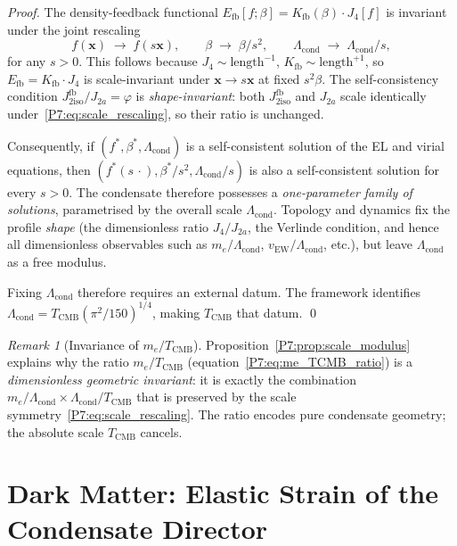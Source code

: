 \documentclass[11pt,a4paper]{article}
\theoremstyle{definition}
\theoremstyle{remark}
\newtheorem{remark}[theorem]{Remark}
\newcommand{\vp}{\varphi}
\newcommand{\bst}{\beta^{*}}
\providecommand{\Kfb}{K_{\mathrm{fb}}}
\providecommand{\Efb}{E_{\mathrm{fb}}}
\newcommand{\TCMB}{T_{\mathrm{CMB}}}
\newcommand{\Lcond}{\Lambda_{\mathrm{cond}}}
\newcommand{\Ja}{J_{2a}}
\newcommand{\Jfb}{J_{2\mathrm{iso}}^{\mathrm{fb}}}
\newcommand{\Jfour}{J_{4}}
\begin{document}
\begin{proof}
The density-feedback functional $\Efb[f;\beta] = \Kfb(\beta)\cdot\Jfour[f]$
is invariant under the joint rescaling
\begin{equation}
  f(\mathbf{x}) \;\to\; f(s\mathbf{x}),
  \qquad
  \beta \;\to\; \beta/s^2,
  \qquad
  \Lcond \;\to\; \Lcond/s,
  \label{P7:eq:scale_rescaling}
\end{equation}
for any $s>0$.
This follows because $\Jfour\sim\mathrm{length}^{-1}$, $\Kfb\sim\mathrm{length}^{+1}$,
so $\Efb = \Kfb\cdot\Jfour$ is scale-invariant under $\mathbf{x}\to s\mathbf{x}$
at fixed $s^2\beta$.
The self-consistency condition $\Jfb/\Ja = \vp$ is \emph{shape-invariant}:
both $\Jfb$ and $\Ja$ scale identically under~\eqref{P7:eq:scale_rescaling},
so their ratio is unchanged.

Consequently, if $(f^*, \bst, \Lcond)$ is a self-consistent solution of
the EL and virial equations, then $(f^*(s\,\cdot), \bst/s^2, \Lcond/s)$
is also a self-consistent solution for every $s>0$.
The condensate therefore possesses a \emph{one-parameter family of solutions},
parametrised by the overall scale $\Lcond$.
Topology and dynamics fix the profile \emph{shape} (the dimensionless ratio
$J_4/J_{2a}$, the Verlinde condition, and hence all dimensionless
observables such as $m_e/\Lcond$, $v_\mathrm{EW}/\Lcond$, etc.),
but leave $\Lcond$ as a free modulus.

Fixing $\Lcond$ therefore requires an external datum.
The framework identifies $\Lcond = \TCMB(\pi^2/150)^{1/4}$, making
$\TCMB$ that datum.
\qed
\end{proof}

\begin{remark}[Invariance of $m_e/\TCMB$]
\label{P7:rem:me_tcmb_invariance}
Proposition~\ref{P7:prop:scale_modulus} explains why the ratio
$m_e/\TCMB$ (equation~\eqref{P7:eq:me_TCMB_ratio}) is a
\emph{dimensionless geometric invariant}: it is exactly the
combination $m_e/\Lcond \times \Lcond/\TCMB$ that is preserved by
the scale symmetry~\eqref{P7:eq:scale_rescaling}.
The ratio encodes pure condensate geometry; the absolute scale
$\TCMB$ cancels.
\end{remark}

\section{Dark Matter: Elastic Strain of the Condensate Director}
\label{P7:sec:dark_matter}
\end{document}
